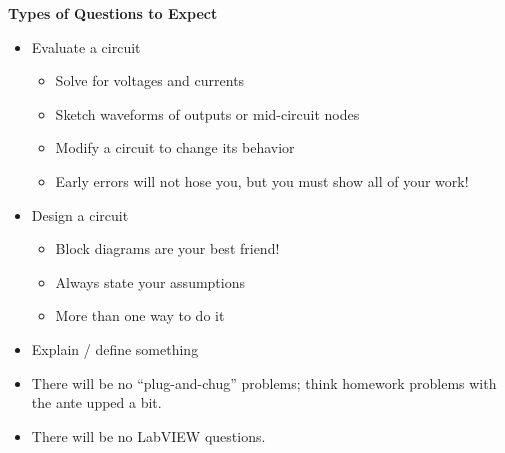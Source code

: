 \documentclass[11pt]{article}
\begin{document}
{\bf Types of Questions to Expect}
\begin{itemize}
    \item Evaluate a circuit
    \begin{itemize}
        \item Solve for voltages and currents
        \item Sketch waveforms of outputs or mid-circuit nodes
        \item Modify a circuit to change its behavior
        \item Early errors will not hose you, but you must show all of your work!
    \end{itemize}
    \item Design a circuit
    \begin{itemize}
        \item Block diagrams are your best friend!
        \item Always state your assumptions
        \item More than one way to do it
    \end{itemize}
    \item Explain / define something
    \item There will be no ``plug-and-chug'' problems; think homework problems with the ante upped a bit.
    \item There will be no LabVIEW questions.
\end{itemize}
\end{document}
